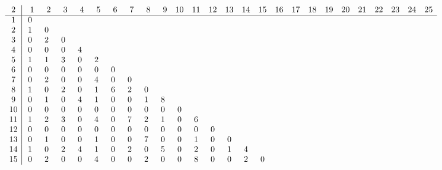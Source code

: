 \documentclass[12pt,a4paper]{article}
\begin{document}
	\begin{landscape}
	\small
	\[
	\begin{array}{c|ccccccccccccccccccccccccc}\addcontentsline{lot}{table}{\protect\numberline{}Dimensions of the Kernel of $\mathcal{L}_{r,c,2}$}
	 2&  \phantom{0}1&  \phantom{0}2&  \phantom{0}3&  \phantom{0}4&  \phantom{0}5&  \phantom{0}6&  \phantom{0}7&  \phantom{0}8&  \phantom{0}9& 10& 11& 12& 13& 14& 15& 16& 17& 18& 19& 20& 21& 22& 23& 24& 25\\
	\hline
	 1&  0&   &   &   &   &   &   &   &   &   &   &   &   &   &   &   &   &   &   &   &   &   &   &   &   \\
	 2&  1&  0&   &   &   &   &   &   &   &   &   &   &   &   &   &   &   &   &   &   &   &   &   &   &   \\
	 3&  0&  2&  0&   &   &   &   &   &   &   &   &   &   &   &   &   &   &   &   &   &   &   &   &   &   \\
	 4&  0&  0&  0&  4&   &   &   &   &   &   &   &   &   &   &   &   &   &   &   &   &   &   &   &   &   \\
	 5&  1&  1&  3&  0&  2&   &   &   &   &   &   &   &   &   &   &   &   &   &   &   &   &   &   &   &   \\
	 6&  0&  0&  0&  0&  0&  0&   &   &   &   &   &   &   &   &   &   &   &   &   &   &   &   &   &   &   \\
	 7&  0&  2&  0&  0&  4&  0&  0&   &   &   &   &   &   &   &   &   &   &   &   &   &   &   &   &   &   \\
	 8&  1&  0&  2&  0&  1&  6&  2&  0&   &   &   &   &   &   &   &   &   &   &   &   &   &   &   &   &   \\
	 9&  0&  1&  0&  4&  1&  0&  0&  1&  8&   &   &   &   &   &   &   &   &   &   &   &   &   &   &   &   \\
	10&  0&  0&  0&  0&  0&  0&  0&  0&  0&  0&   &   &   &   &   &   &   &   &   &   &   &   &   &   &   \\
	11&  1&  2&  3&  0&  4&  0&  7&  2&  1&  0&  6&   &   &   &   &   &   &   &   &   &   &   &   &   &   \\
	12&  0&  0&  0&  0&  0&  0&  0&  0&  0&  0&  0&  0&   &   &   &   &   &   &   &   &   &   &   &   &   \\
	13&  0&  1&  0&  0&  1&  0&  0&  7&  0&  0&  1&  0&  0&   &   &   &   &   &   &   &   &   &   &   &   \\
	14&  1&  0&  2&  4&  1&  0&  2&  0&  5&  0&  2&  0&  1&  4&   &   &   &   &   &   &   &   &   &   &   \\
	15&  0&  2&  0&  0&  4&  0&  0&  2&  0&  0&  8&  0&  0&  2&  0&   &   &   &   &   &   &   &   &   &   \\

\end{array}\]
\end{landscape}
\end{document}
